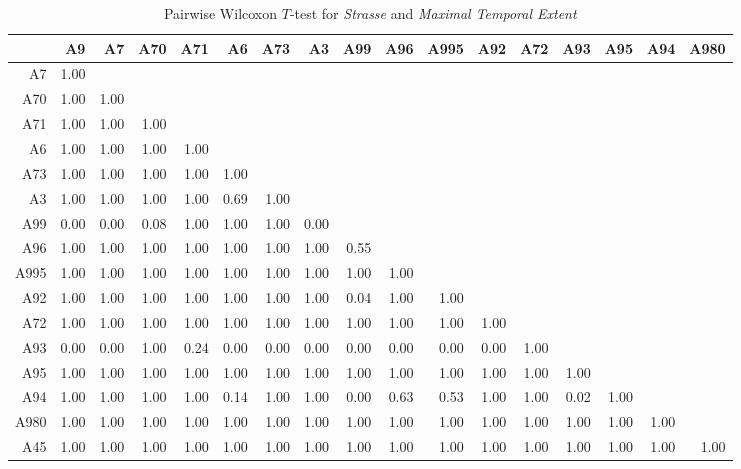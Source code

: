\begin{table}[ht!]
	\tiny
	\setlength{\tabcolsep}{4pt}
	\centering
  \begin{tabular}{rrrrrrrrrrrrrrrrr}
    \hline
         & A9 & A7 & A70 & A71 & A6 & A73 & A3 & A99 & A96 & A995 & A92 & A72 & A93 & A95 & A94 & A980 \\ 
    \hline
    A7   & 1.00 &  &  &  &  &  &  &  &  &  &  &  &  &  &  &  \\ 
    A70  & 1.00 & 1.00 &  &  &  &  &  &  &  &  &  &  &  &  &  &  \\ 
    A71  & 1.00 & 1.00 & 1.00 &  &  &  &  &  &  &  &  &  &  &  &  &  \\ 
    A6   & 1.00 & 1.00 & 1.00 & 1.00 &  &  &  &  &  &  &  &  &  &  &  &  \\ 
    A73  & 1.00 & 1.00 & 1.00 & 1.00 & 1.00 &  &  &  &  &  &  &  &  &  &  &  \\ 
    A3   & 1.00 & 1.00 & 1.00 & 1.00 & 0.69 & 1.00 &  &  &  &  &  &  &  &  &  &  \\ 
    A99  & 0.00 & 0.00 & 0.08 & 1.00 & 1.00 & 1.00 & 0.00 &  &  &  &  &  &  &  &  &  \\ 
    A96  & 1.00 & 1.00 & 1.00 & 1.00 & 1.00 & 1.00 & 1.00 & 0.55 &  &  &  &  &  &  &  &  \\ 
    A995 & 1.00 & 1.00 & 1.00 & 1.00 & 1.00 & 1.00 & 1.00 & 1.00 & 1.00 &  &  &  &  &  &  &  \\ 
    A92  & 1.00 & 1.00 & 1.00 & 1.00 & 1.00 & 1.00 & 1.00 & 0.04 & 1.00 & 1.00 &  &  &  &  &  &  \\ 
    A72  & 1.00 & 1.00 & 1.00 & 1.00 & 1.00 & 1.00 & 1.00 & 1.00 & 1.00 & 1.00 & 1.00 &  &  &  &  &  \\ 
    A93  & 0.00 & 0.00 & 1.00 & 0.24 & 0.00 & 0.00 & 0.00 & 0.00 & 0.00 & 0.00 & 0.00 & 1.00 &  &  &  &  \\ 
    A95  & 1.00 & 1.00 & 1.00 & 1.00 & 1.00 & 1.00 & 1.00 & 1.00 & 1.00 & 1.00 & 1.00 & 1.00 & 1.00 &  &  &  \\ 
    A94  & 1.00 & 1.00 & 1.00 & 1.00 & 0.14 & 1.00 & 1.00 & 0.00 & 0.63 & 0.53 & 1.00 & 1.00 & 0.02 & 1.00 &  &  \\ 
    A980 & 1.00 & 1.00 & 1.00 & 1.00 & 1.00 & 1.00 & 1.00 & 1.00 & 1.00 & 1.00 & 1.00 & 1.00 & 1.00 & 1.00 & 1.00 &  \\ 
    A45  & 1.00 & 1.00 & 1.00 & 1.00 & 1.00 & 1.00 & 1.00 & 1.00 & 1.00 & 1.00 & 1.00 & 1.00 & 1.00 & 1.00 & 1.00 & 1.00 \\ 
    \hline
  \end{tabular}
	\caption{Pairwise Wilcoxon $T$-test for \textit{Strasse} and \textit{Maximal Temporal Extent}}
	\label{tbl:wilcoxon_baysis_matched_Strasse_TMax}
\end{table}
